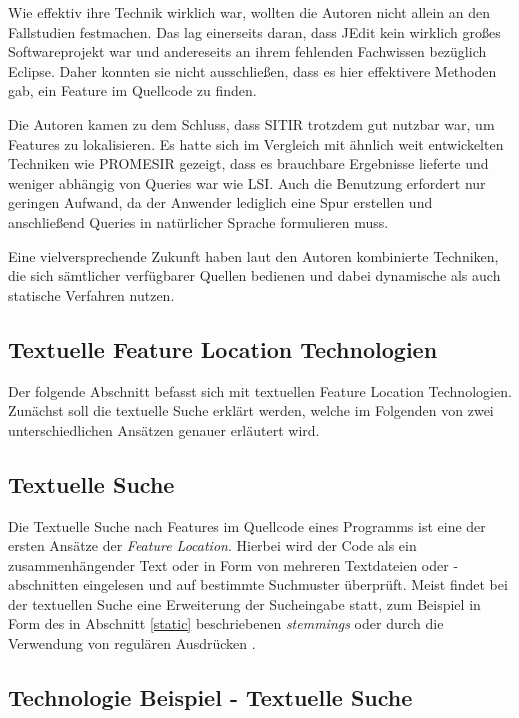 \documentclass[runningheads,a4paper]{llncs}
\begin{document}
Wie effektiv ihre Technik wirklich war, wollten die Autoren nicht allein an den Fallstudien festmachen. Das lag einerseits daran, dass JEdit kein wirklich großes Softwareprojekt war und andereseits an ihrem fehlenden Fachwissen bezüglich Eclipse. Daher konnten sie nicht ausschließen, dass es hier effektivere Methoden gab, ein Feature im Quellcode zu finden.

Die Autoren kamen zu dem Schluss, dass \ac{SITIR} trotzdem gut nutzbar war, um Features zu lokalisieren. Es hatte sich im Vergleich mit ähnlich weit entwickelten Techniken wie PROMESIR gezeigt, dass es brauchbare Ergebnisse lieferte und weniger abhängig von Queries war wie \ac{LSI}. Auch die Benutzung erfordert nur geringen Aufwand, da der Anwender lediglich eine Spur erstellen und anschließend Queries in natürlicher Sprache formulieren muss.

Eine vielversprechende Zukunft haben laut den Autoren kombinierte Techniken, die sich sämtlicher verfügbarer Quellen bedienen und dabei dynamische als auch statische Verfahren nutzen. 

\subsection{Textuelle Feature Location Technologien}

Der folgende Abschnitt befasst sich mit textuellen Feature Location Technologien. Zunächst soll die textuelle Suche erklärt werden, welche im Folgenden von zwei unterschiedlichen Ansätzen genauer erläutert wird.

\subsection*{Textuelle Suche}

Die Textuelle Suche nach Features im Quellcode eines Programms ist eine der ersten Ansätze der \textit{Feature Location}. Hierbei wird der Code als ein zusammenhängender Text oder in Form von mehreren Textdateien oder -abschnitten eingelesen und auf bestimmte Suchmuster überprüft. Meist findet bei der textuellen Suche eine Erweiterung der Sucheingabe statt, zum Beispiel in Form des in Abschnitt \ref{static} beschriebenen \textit{stemmings} oder durch die Verwendung von regulären Ausdrücken \cite{grep}.

\subsection*{Technologie Beispiel - Textuelle Suche}
\end{document}
